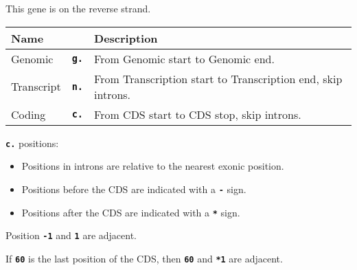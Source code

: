 \documentclass[a4, portrait]{seminar}
\newcommand{\bt}[1]{\texttt{\textbf{#1}}}
\begin{document}
\begin{slide}

  \positionpicture

  This gene is on the reverse strand.

  \bigskip
  \begin{tabular}{l|l|l}
    Name       &         & Description\\
    \hline
    Genomic    & \bt{g.} & From {\scriptsize Genomic start} to
                           {\scriptsize Genomic end}. \\
    Transcript & \bt{n.} & From {\scriptsize Transcription start} to 
                           {\scriptsize Transcription end}, skip introns.\\
    Coding     & \bt{c.} & From {\scriptsize CDS start} to 
                           {\scriptsize CDS stop}, skip introns.
  \end{tabular}
  \vfill
\end{slide}

\begin{slide}

  \positionpicture

  \bt{c.} positions:
  \begin{itemize}
    \item Positions in introns are relative to the nearest exonic position.
    \item Positions before the CDS are indicated with a \bt{-} sign.
    \item Positions after the CDS are indicated with a \bt{*} sign.
  \end{itemize}

  Position \bt{-1} and \bt{1} are adjacent.

  If \bt{60} is the last position of the CDS, then \bt{60} and \bt{*1} are
  adjacent.
  \vfill
\end{slide}
\end{document}
